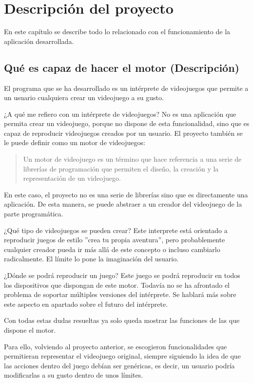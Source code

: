 \chapter{Descripción del proyecto}
En este capítulo se describe todo lo relacionado con el funcionamiento de la aplicación desarrollada.

\section{Qué es capaz de hacer el motor (Descripción)}

El programa que se ha desarrollado es un intérprete de videojuegos que permite a un usuario cualquiera crear un videojuego a su gusto. 

¿A qué me refiero con un intérprete de videojuegos?
No es una aplicación que permita crear un videojuego, porque no dispone de esta funcionalidad, sino que es capaz de reproducir videojuegos creados por un usuario.
El proyecto también se le puede definir como un motor de videojuegos:
\begin{quote}
	\small Un motor de videojuego es un término que hace referencia a una serie de librerías de programación que permiten el diseño, la creación y la representación de un videojuego. \cite{Alberto_Carrasco}
\end{quote}
En este caso, el proyecto no es una serie de librerías sino que es directamente una aplicación. De esta manera, se puede abstraer a un creador del videojuego de la parte programática.

¿Qué tipo de videojuegos se pueden crear?
Este interprete está orientado a reproducir juegos de estilo ''crea tu propia aventura'', pero probablemente cualquier creador pueda ir más allá de este concepto o incluso cambiarlo radicalmente. El límite lo pone la imaginación del usuario.

¿Dónde se podrá reproducir un juego?
Este juego se podrá reproducir en todos los dispositivos que dispongan de este motor. Todavía no se ha afrontado el problema de soportar múltiples versiones del intérprete. Se hablará más sobre este aspecto en apartado sobre el futuro del intérprete.

Con todas estas dudas resueltas ya solo queda mostrar las funciones de las que dispone el motor.

Para ello, volviendo al proyecto anterior, se escogieron funcionalidades que permitieran representar el videojuego original, siempre siguiendo la idea de que las acciones dentro del juego debían ser genéricas, es decir, un usuario podría modificarlas a su gusto dentro de unos límites. 

